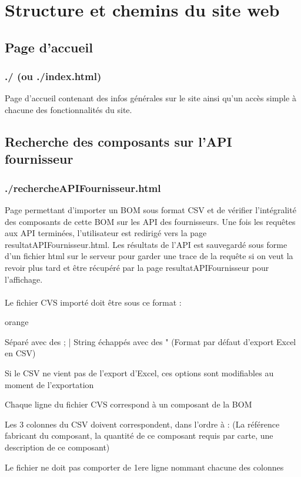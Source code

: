 \chapter{Structure et chemins du site web}

\section{Page d’accueil}

\subsection{./ (ou ./index.html)}

Page d’accueil contenant des infos générales sur le site ainsi qu’un accès simple à chacune des fonctionnalités du site.

\section{Recherche des composants sur l’API fournisseur}

\subsection{./rechercheAPIFournisseur.html}

Page permettant d’importer un BOM sous format CSV et de vérifier l’intégralité des composants de cette BOM sur les API des fournisseurs. Une fois les requêtes aux API terminées, l’utilisateur est redirigé vers la page resultatAPIFournisseur.html. Les résultats de l’API est sauvegardé sous forme d’un fichier html sur le serveur pour garder une trace de la requête si on veut la revoir plus tard et être récupéré par la page resultatAPIFournisseur pour l’affichage.
\\ \\
Le fichier CVS importé doit être sous ce format :

\begin{items}{orange}{\Triangle}
\item Séparé avec des ; | String échappés avec des " (Format par défaut d’export Excel en CSV)
\item Si le CSV ne vient pas de l’export d’Excel, ces options sont modifiables au moment de l’exportation
\item Chaque ligne du fichier CVS correspond à un composant de la BOM
\item Les 3 colonnes du CSV doivent correspondent, dans l’ordre à : (La référence fabricant du composant, la quantité de ce composant requis par carte, une description de ce composant)
\item Le fichier ne doit pas comporter de 1ere ligne nommant chacune des colonnes
\end{items}

